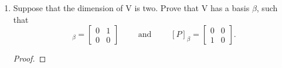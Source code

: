 \documentclass[11pt]{scrartcl}
\begin{document}
\begin{enumerate}[label=\alph*.]
{\begin{proof}
		      Thus, $dim(N_T) \leq dim(N_P)$ because  $dim(P(N_T)) \leq dim(N_T)$.\\\-\\
		      Thus, $dim(N_P) = dim(N_T) = n = m$.
		      \begin{align*}
			      dim(V) & = dim(N_T) + dim(N_P) \\
			             & = n + m               \\
			             & = n + n = m + m            \\
			             & = 2n = 2m
		      \end{align*}

		      Therefore, $dim(V)$ is even.
	      \end{proof}
	      }
	\item{
	      Suppose that the dimension of $\mathrm{V}$ is two. Prove that $\mathrm{V}$ has a basis $\beta$, such that
	      \begin{equation}
		      [T]_{\beta} = \left [ \begin{array}{cc}
				      0 & 1 \\
				      0 & 0
			      \end{array} \right] \qquad \text{ and } \qquad [P]_{\beta} = \left [ \begin{array}{cc}
				      0 & 0 \\
				      1 & 0
			      \end{array} \right] .
	      \end{equation}
	      \begin{proof}

	      \end{proof}
	      }
\end{enumerate}
\end{document}
